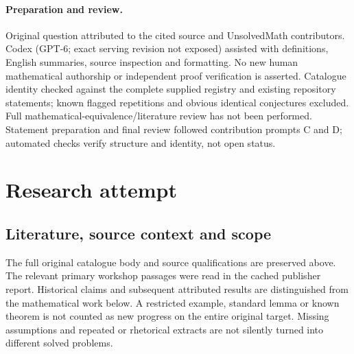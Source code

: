 \documentclass[11pt]{article}
\begin{document}
\paragraph{Preparation and review.}
Original question attributed to the cited source and UnsolvedMath contributors. Codex (GPT-6; exact serving revision not exposed) assisted with definitions, English summaries, source inspection and formatting. No new human mathematical authorship or independent proof verification is asserted. Catalogue identity checked against the complete supplied registry and existing repository statements; known flagged repetitions and obvious identical conjectures excluded. Full mathematical-equivalence/literature review has not been performed. Statement preparation and final review followed contribution prompts C and D; automated checks verify structure and identity, not open status.
\label{end:statement}

\section{Research attempt}
\subsection{Literature, source context and scope}
The full original catalogue body and source qualifications are preserved above. The relevant primary workshop passages were read in the cached publisher report. Historical claims and subsequent attributed results are distinguished from the mathematical work below. A restricted example, standard lemma or known theorem is not counted as new progress on the entire original target. Missing assumptions and repeated or rhetorical extracts are not silently turned into different solved problems.
\end{document}
